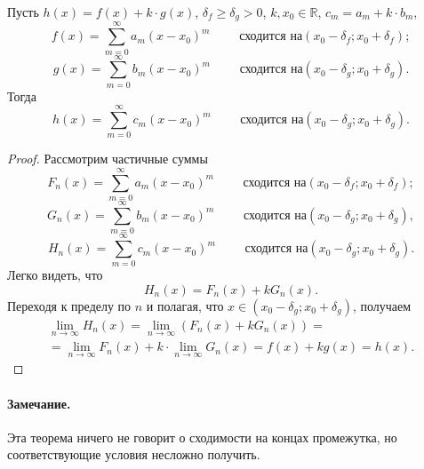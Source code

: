\begin{theorem}
	Пусть $h(x)=f(x) + k\cdot g(x)$, $\delta_f \geq \delta_g > 0$, $k, x_0 \in \mathbb R$, $c_m=a_m + k\cdot b_m$,
	\begin{equation}
		f(x) = \sum_{m=0}^\infty a_m (x-x_0)^m
		\qquad
		\mbox{ сходится на}
		(x_0 - \delta_f;x_0 + \delta_f)
		;
	\end{equation}
	\begin{equation}
		g(x) = \sum_{m=0}^\infty b_m (x-x_0)^m
		\qquad
		\mbox{ сходится на}
		(x_0 - \delta_g;x_0 + \delta_g)
		.
	\end{equation}
	Тогда
	\begin{equation}
		h(x) = \sum_{m=0}^\infty c_m (x-x_0)^m
		\qquad
		\mbox{ сходится на}
		(x_0 - \delta_g;x_0 + \delta_g)
		.
	\end{equation}
\end{theorem}

\begin{proof}
	Рассмотрим частичные суммы
	\begin{equation}
		F_n(x) = \sum_{m=0}^\infty a_m (x-x_0)^m
		\qquad
		\mbox{ сходится на}
		(x_0 - \delta_f;x_0 + \delta_f)
		;
	\end{equation}
	\begin{equation}
		G_n(x) = \sum_{m=0}^\infty b_m (x-x_0)^m
		\qquad
		\mbox{ сходится на}
		(x_0 - \delta_g;x_0 + \delta_g)
		,
	\end{equation}
	\begin{equation}
		H_n(x) = \sum_{m=0}^\infty c_m (x-x_0)^m
		\qquad
		\mbox{ сходится на}
		(x_0 - \delta_g;x_0 + \delta_g)
		.
	\end{equation}
	Легко видеть, что
	\begin{equation}
		H_n(x) = F_n(x) + k G_n(x)
		.
	\end{equation}
	Переходя к пределу по $n$ и полагая, что $x\in(x_0-\delta_g; x_0+\delta_g)$, получаем
	\begin{multline*}
		\lim_{n\to\infty} H_n(x) =
		\lim_{n\to\infty} \left(F_n(x) + k G_n(x)\right) =
		\\=
		\lim_{n\to\infty} F_n(x) + k \cdot \lim_{n\to\infty} G_n(x) =
		f(x) + k g(x) = h(x)
		.
	\end{multline*}


\end{proof}

\paragraph{Замечание.}
	Эта теорема ничего не говорит о сходимости на концах промежутка,
	но соответствующие условия несложно получить.
